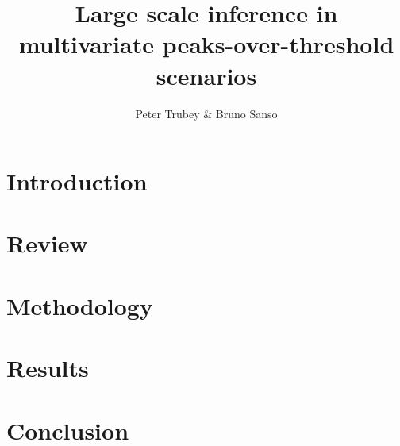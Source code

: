\documentclass{article}
\title{Large scale inference in multivariate peaks-over-threshold scenarios}
\author{Peter Trubey \& Bruno Sanso}
\begin{document}
\maketitle

\begin{abstract}
    
\end{abstract}

\section{Introduction}


\section{Review}


\section{Methodology}


\section{Results}


\section{Conclusion}


\appendix




\end{document}
